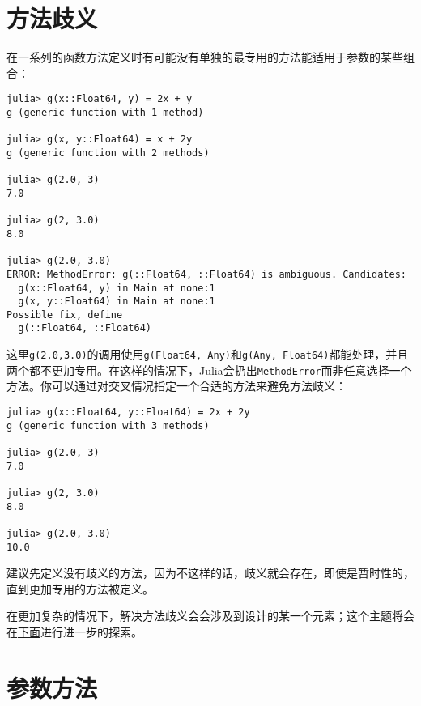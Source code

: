\section{方法歧义}



在一系列的函数方法定义时有可能没有单独的最专用的方法能适用于参数的某些组合：




\begin{verbatim}
julia> g(x::Float64, y) = 2x + y
g (generic function with 1 method)

julia> g(x, y::Float64) = x + 2y
g (generic function with 2 methods)

julia> g(2.0, 3)
7.0

julia> g(2, 3.0)
8.0

julia> g(2.0, 3.0)
ERROR: MethodError: g(::Float64, ::Float64) is ambiguous. Candidates:
  g(x::Float64, y) in Main at none:1
  g(x, y::Float64) in Main at none:1
Possible fix, define
  g(::Float64, ::Float64)
\end{verbatim}



这里\texttt{g(2.0,3.0)}的调用使用\texttt{g(Float64, Any)}和\texttt{g(Any, Float64)}都能处理，并且两个都不更加专用。在这样的情况下，Julia会扔出\hyperlink{68769522931907606}{\texttt{MethodError}}而非任意选择一个方法。你可以通过对交叉情况指定一个合适的方法来避免方法歧义：




\begin{verbatim}
julia> g(x::Float64, y::Float64) = 2x + 2y
g (generic function with 3 methods)

julia> g(2.0, 3)
7.0

julia> g(2, 3.0)
8.0

julia> g(2.0, 3.0)
10.0
\end{verbatim}



建议先定义没有歧义的方法，因为不这样的话，歧义就会存在，即使是暂时性的，直到更加专用的方法被定义。



在更加复杂的情况下，解决方法歧义会会涉及到设计的某一个元素；这个主题将会在\hyperlink{15846346227037149553}{下面}进行进一步的探索。



\hypertarget{14064657876301533350}{}


\section{参数方法}



